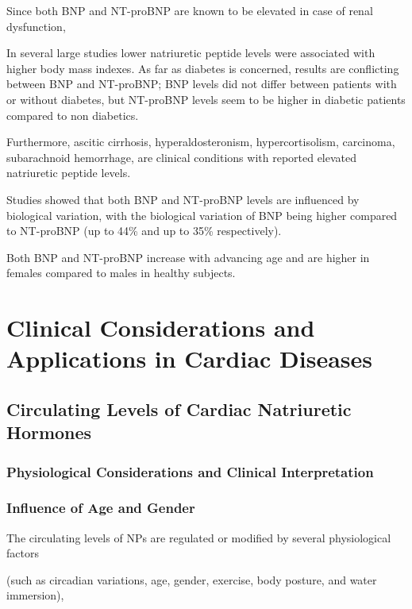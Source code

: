 \documentclass[14pt,a4paper,onecolumn]{extarticle}
\begin{document}
Since both BNP and NT-proBNP are known to be elevated in case of renal dysfunction, \citep{Luchner2005}

In several large studies lower natriuretic peptide levels were associated with higher body mass indexes. \citep{Das2005,Krauser2005,Mehra2004,Wang2004b} As far as diabetes is concerned, results are conflicting between BNP and NT-proBNP; BNP levels did not differ between patients with or without diabetes, \citep{Wu2004} but NT-proBNP levels seem to be higher in diabetic patients compared to non diabetics. \citep{Magnusson2004}

Furthermore, ascitic cirrhosis, hyperaldosteronism, hypercortisolism, carcinoma, subarachnoid hemorrhage, \citep{Pfister2004} are clinical conditions with reported elevated natriuretic peptide levels.



Studies showed that both BNP and NT-proBNP levels are influenced by biological variation, with the biological variation of BNP being higher compared to NT-proBNP (up to 44\% and up to 35\% respectively). \citep{Bruins2004,Wu2003b}

Both BNP and NT-proBNP increase with advancing age and are higher in females compared to males in healthy subjects. \citep{Raymond2003}



\section{Clinical Considerations and Applications in Cardiac Diseases}

\subsection{ Circulating Levels of Cardiac Natriuretic Hormones}

\subsubsection{Physiological Considerations and Clinical Interpretation}

\subsubsection{ Influence of Age and Gender}

The circulating levels of NPs are regulated or modified by several physiological factors

(such as circadian variations, age, gender, exercise, body posture, and water immersion),
\end{document}
